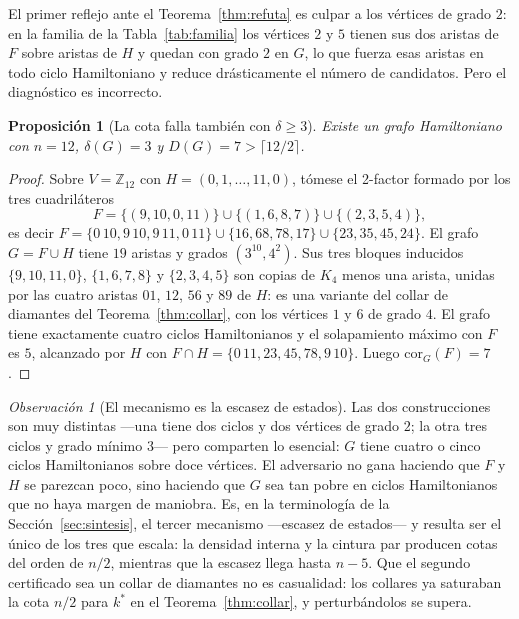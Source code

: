 \documentclass[11pt,a4paper]{article}
\newtheorem{proposicion}[teorema]{Proposición}
\theoremstyle{definition}
\theoremstyle{remark}
\newtheorem{observacion}[teorema]{Observación}
\begin{document}
El primer reflejo ante el Teorema~\ref{thm:refuta} es culpar a los vértices de grado $2$: en la familia de la Tabla~\ref{tab:familia} los vértices $2$ y $5$ tienen sus dos aristas de $F$ sobre aristas de $H$ y quedan con grado $2$ en $G$, lo que fuerza esas aristas en todo ciclo Hamiltoniano y reduce drásticamente el número de candidatos. Pero el diagnóstico es incorrecto.

\begin{proposicion}[La cota falla también con $\delta\ge3$]\label{prop:delta3}
Existe un grafo Hamiltoniano con $n=12$, $\delta(G)=3$ y $D(G)=7>\lceil 12/2\rceil$.
\end{proposicion}

\begin{proof}
Sobre $V=\mathbb{Z}_{12}$ con $H=(0,1,\dots,11,0)$, tómese el 2-factor formado por los tres cuadriláteros
\[
F=\{(9,10,0,11)\}\cup\{(1,6,8,7)\}\cup\{(2,3,5,4)\},
\]
es decir $F=\{0\,10,9\,10,9\,11,0\,11\}\cup\{16,68,78,17\}\cup\{23,35,45,24\}$. El grafo $G=F\cup H$ tiene $19$ aristas y grados $(3^{10},4^2)$. Sus tres bloques inducidos $\{9,10,11,0\}$, $\{1,6,7,8\}$ y $\{2,3,4,5\}$ son copias de $K_4$ menos una arista, unidas por las cuatro aristas $01$, $12$, $56$ y $89$ de $H$: es una variante del collar de diamantes del Teorema~\ref{thm:collar}, con los vértices $1$ y $6$ de grado $4$. El grafo tiene exactamente cuatro ciclos Hamiltonianos y el solapamiento máximo con $F$ es $5$, alcanzado por $H$ con $F\cap H=\{0\,11,23,45,78,9\,10\}$. Luego $\mathrm{cor}_G(F)=7$.
\end{proof}

\begin{observacion}[El mecanismo es la escasez de estados]\label{obs:mecanismo}
Las dos construcciones son muy distintas —una tiene dos ciclos y dos vértices de grado $2$; la otra tres ciclos y grado mínimo $3$— pero comparten lo esencial: $G$ tiene cuatro o cinco ciclos Hamiltonianos sobre doce vértices. El adversario no gana haciendo que $F$ y $H$ se parezcan poco, sino haciendo que $G$ sea tan pobre en ciclos Hamiltonianos que no haya margen de maniobra. Es, en la terminología de la Sección~\ref{sec:sintesis}, el tercer mecanismo —escasez de estados— y resulta ser el único de los tres que escala: la densidad interna y la cintura par producen cotas del orden de $n/2$, mientras que la escasez llega hasta $n-5$. Que el segundo certificado sea un collar de diamantes no es casualidad: los collares ya saturaban la cota $n/2$ para $k^*$ en el Teorema~\ref{thm:collar}, y perturbándolos se supera.
\end{observacion}
\end{document}
